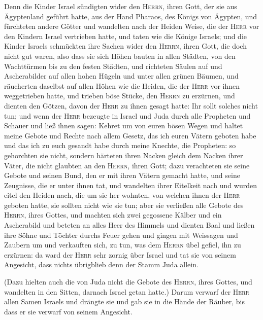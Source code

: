 Denn die Kinder Israel sündigten wider den
\textsc{Herrn}, ihren Gott, der sie aus Ägyptenland geführt hatte, aus
der Hand Pharaos, des Königs von Ägypten, und fürchteten andere Götter
 und wandelten nach der Heiden Weise, die der
\textsc{Herr} vor den Kindern Israel vertrieben hatte, und taten wie die
Könige Israels;  und die Kinder Israels schmückten ihre
Sachen wider den \textsc{Herrn}, ihren Gott, die doch nicht gut waren,
also dass sie sich Höhen bauten in allen Städten, von den Wachttürmen
bis zu den festen Städten,  und richteten Säulen auf und
Ascherabilder auf allen hohen Hügeln und unter allen grünen Bäumen,
 und räucherten daselbst auf allen Höhen wie die Heiden,
die der \textsc{Herr} vor ihnen weggetrieben hatte, und trieben böse
Stücke, den \textsc{Herrn} zu erzürnen,  und dienten den
Götzen, davon der \textsc{Herr} zu ihnen gesagt hatte: Ihr sollt solches
nicht tun;  und wenn der \textsc{Herr} bezeugte in Israel
und Juda durch alle Propheten und Schauer und ließ ihnen sagen: Kehret
um von euren bösen Wegen und haltet meine Gebote und Rechte nach allem
Gesetz, das ich euren Vätern geboten habe und das ich zu euch gesandt
habe durch meine Knechte, die Propheten:  so gehorchten
sie nicht, sondern härteten ihren Nacken gleich dem Nacken ihrer Väter,
die nicht glaubten an den \textsc{Herrn}, ihren Gott; 
dazu verachteten sie seine Gebote und seinen Bund, den er mit ihren
Vätern gemacht hatte, und seine Zeugnisse, die er unter ihnen tat, und
wandelten ihrer Eitelkeit nach und wurden eitel den Heiden nach, die um
sie her wohnten, von welchen ihnen der \textsc{Herr} geboten hatte, sie
sollten nicht wie sie tun;  aber sie verließen alle
Gebote des \textsc{Herrn}, ihres Gottes, und machten sich zwei gegossene
Kälber und ein Ascherabild und beteten an alles Heer des Himmels und
dienten Baal  und ließen ihre Söhne und Töchter durchs
Feuer gehen und gingen mit Weissagen und Zaubern um und verkauften sich,
zu tun, was dem \textsc{Herrn} übel gefiel, ihn zu erzürnen:
 da ward der \textsc{Herr} sehr zornig über Israel und
tat sie von seinem Angesicht, dass nichts übrigblieb denn der Stamm Juda
allein.

 (Dazu hielten auch die von Juda nicht die Gebote des
\textsc{Herrn}, ihres Gottes, und wandelten in den Sitten, darnach
Israel getan hatte.)  Darum verwarf der \textsc{Herr}
allen Samen Israels und drängte sie und gab sie in die Hände der Räuber,
bis dass er sie verwarf von seinem Angesicht.

